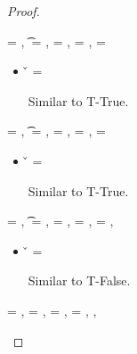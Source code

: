 \begin{lemma}
\begin{proof}
\begin{case}[T-False]
\begin{itemize}
\end{itemize}
\end{case}

\begin{case}[T-Class] \e{} = {\class{}},
  \t{} = {\Class{}},
  \thenprop{\prop{}} = {\topprop{}},
  \elseprop{\prop{}} = {\botprop{}},
  \object{} = {\emptyobject{}}

  \begin{itemize}
    \item[]
      \begin{subcase}[B-Val] \v{} = {\class{}}

        Similar to T-True.
      \end{subcase}
  \end{itemize}
\end{case}

\begin{case}[T-Instance] \e{} = {\classvalue{\classhint{}} {\overrightarrow {\classfieldpair{\fld{}} {\v{}}}}},
  \t{} = {\class{}},
  \thenprop{\prop{}} = {\topprop{}},
  \elseprop{\prop{}} = {\botprop{}},
  \object{} = {\emptyobject{}}

  \begin{itemize}
    \item[]
      \begin{subcase}[B-Val] \v{} = {\classvalue{\classhint{}} {\overrightarrow {\classfieldpair{\fld{}} {\v{}}}}}

        Similar to T-True.
      \end{subcase}
  \end{itemize}
\end{case}


\begin{case}[T-Nil]
\e{} = \nil, \t{} = \Nil, \thenprop{\prop{}} = \botprop{}, \elseprop{\prop{}} = \topprop{}, \object{} = \emptyobject{},

\begin{itemize}
  \item[] 
    \begin{subcase}[B-Val] 
      \v{} = \nil{}

      Similar to T-False.
\end{subcase}

\end{itemize}

\end{case}

\begin{case}[T-Local]
  \e{} = \x{}, \thenprop{\prop{}} = {\notprop {\falsy{}} {\x{}}},
  \elseprop{\prop{}} = {\isprop {\falsy{}} {\x{}}},
\object{} = \x{}, 
\inpropenv{\propenv{}}{\isprop{\t{}}{\x{}}},


\end{case}
\end{proof}
\end{lemma}
